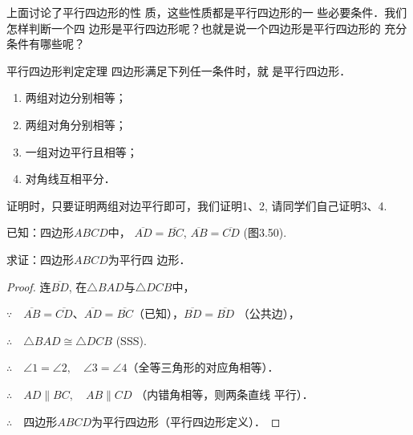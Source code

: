 上面讨论了平行四边形的性
质，这些性质都是平行四边形的一
些必要条件．我们怎样判断一个四
边形是平行四边形呢？也就是说一个四边形是平行四边形的
充分条件有哪些呢？

\begin{blk}
    {平行四边形判定定理} 四边形满足下列任一条件时，就
是平行四边形．
\begin{enumerate}
\item 两组对边分别相等；
\item 两组对角分别相等；
\item 一组对边平行且相等；
\item 对角线互相平分．
\end{enumerate}
\end{blk}

证明时，只要证明两组对边平行即可，我们证明1、2, 请同学们自己证明3、4.

已知：四边形$ABCD$中，
$\overline{AD}=\overline{BC}$, $\overline{AB}=\overline{CD}$ (图3.50).

求证：四边形$ABCD$为平行四
边形．

\begin{proof}
    连$\overline{BD}$, 在$\triangle BAD$与$\triangle DCB$中，

$\because\quad     \overline{AB}=\overline{CD}$、$\overline{AD}=\overline{BC}$（已知），$\overline{BD}=\overline{BD}$ （公共边），

$\therefore\quad \triangle BAD\cong \triangle DCB$ (SSS).

$\therefore\quad \angle 1=\angle 2,\quad \angle 3=\angle 4$（全等三角形的对应角相等）．

$\therefore\quad AD\parallel BC,\quad AB\parallel CD$ （内错角相等，则两条直线
平行）．

$\therefore\quad $四边形$ABCD$为平行四边形（平行四边形定义）．
\end{proof}

\begin{figure}[htp]\centering
    \begin{minipage}[t]{0.48\textwidth}
    \centering
{}
    \caption{}
    \end{minipage}
    \begin{minipage}[t]{0.48\textwidth}
    \centering
    \caption{}
    \end{minipage}
    \end{figure}

